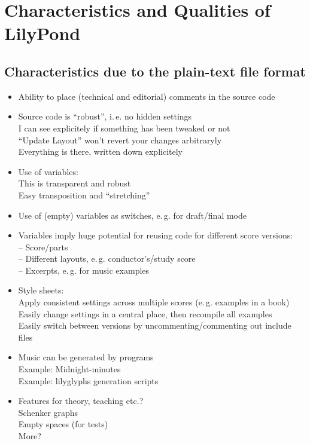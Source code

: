 \documentclass[../../LilyPond-Tutorials]{subfiles}
\begin{document}
\section*{Characteristics and Qualities of LilyPond}
\subsection*{Characteristics due to the plain-text file format}
\begin{itemize}
\item Ability to place (technical and editorial) comments in the source code
\item Source code is “robust”, i.\,e. no hidden settings\\
I can see explicitely if something has been tweaked or not\\
“Update Layout” won't revert your changes arbitraryly\\
Everything is there, written down explicitely
\item Use of variables:\\
This is transparent and robust\\
Easy transposition and “stretching”\\
\item Use of (empty) variables as switches, e.\,g. for draft/final mode
\item Variables imply huge potential for reusing code for different score versions:\\
-- Score/parts\\
-- Different layouts, e.\,g. conductor's/study score\\
-- Excerpts, e.\,g. for music examples
\item Style sheets:\\
Apply consistent settings across multiple scores (e.\,g. examples in a book)\\
Easily change settings in a central place, then recompile all examples\\
Easily switch between versions by uncommenting/commenting out include files
\item Music can be generated by programs\\
Example: Midnight-minutes\\
Example: lilyglyphs generation scripts
\item Features for theory, teaching etc.?\\
Schenker graphs\\
Empty spaces (for tests)\\
More?
\end{itemize}
\end{document}
